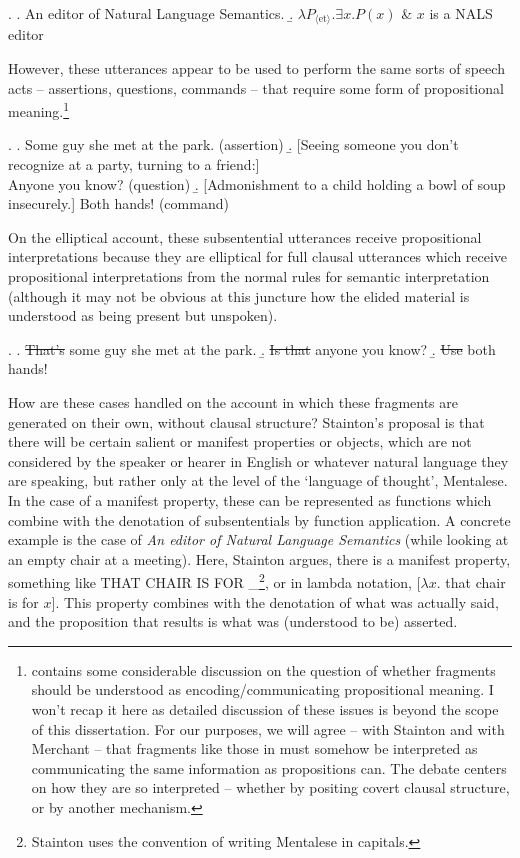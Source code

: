 \documentclass[doublespace]{umthesis}
\newcommand{\ty}[1]{\ensuremath{\mathrm{\langle #1 \rangle}}}
\begin{document}
\ex. 		\a. An editor of Natural Language Semantics.
		\b. $\lambda P_{\ty{et}}. \exists x. P(x) $ \& $x$ is a NALS editor
		
However, these utterances appear to be used to perform the same sorts of speech acts -- assertions, questions, commands -- that require some form of propositional meaning.\footnote{\cite{St06book} contains some considerable discussion on the question of whether fragments should be understood as encoding/communicating propositional meaning. I won't recap it here as detailed discussion of these issues is beyond the scope of this dissertation. For our purposes, we will agree -- with Stainton and with Merchant -- that fragments like those in \LLast must somehow be interpreted as communicating the same information as propositions can. The debate centers on how they are so interpreted -- whether by positing covert clausal structure, or by another mechanism.}

\ex. 		\a. Some guy she met at the park. \hfill (assertion)
		\b. [Seeing someone you don't recognize at a party, turning to a friend:]\\
			Anyone you know? \hfill (question)
		\b. [Admonishment to a child holding a bowl of soup insecurely.] Both hands! \hfill (command)
		
On the elliptical account, these subsentential utterances receive propositional interpretations because they are elliptical for full clausal utterances which receive propositional interpretations from the normal rules for semantic interpretation (although it may not be obvious at this juncture how the elided material is understood as being present but unspoken).

\ex. 		\a. \sout{That's} some guy she met at the park.
		\b. \sout{Is that} anyone you know?
		\b. \sout{Use} both hands!
		
How are these cases handled on the account in which these fragments are generated on their own, without clausal structure? Stainton's proposal is that there will be certain salient or manifest properties or objects, which are not considered by the speaker or hearer in English or whatever natural language they are speaking, but rather only at the level of the `language of thought', Mentalese. In the case of a manifest property, these can be represented as functions which combine with the denotation of subsententials by function application. A concrete example is the case of {\it An editor of Natural Language Semantics} (while looking at an empty chair at a meeting). Here, Stainton argues, there is a manifest property, something like THAT CHAIR IS FOR \_\footnote{Stainton uses the convention of writing Mentalese in capitals.}, or in lambda notation, $[\lambda x. $ that chair is for $x]$. This property combines with the denotation of what was actually said, and the proposition that results is what was (understood 
to be) asserted.
\end{document}
